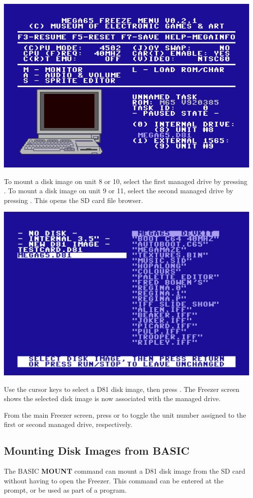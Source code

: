 \begin{center}
  \includegraphics[width=0.7\linewidth]{images/freezer.png}
\end{center}

To mount a disk image on unit 8 or 10, select the first managed drive by pressing . To mount a disk image on unit 9 or 11, select the second managed drive by pressing . This opens the SD card file browser.

\begin{center}
  \includegraphics[width=0.7\linewidth]{images/d81-file-browser.png}
\end{center}

Use the cursor keys to select a D81 disk image, then press . The Freezer screen shows the selected disk image is now associated with the managed drive.

From the main Freezer screen, press  or  to toggle the unit number assigned to the first or second managed drive, respectively.

\subsection{Mounting Disk Images from BASIC}

The BASIC {\bf MOUNT} command can mount a D81 disk image from the SD card without having to open the Freezer. This command can be entered at the  prompt, or be used as part of a program.

